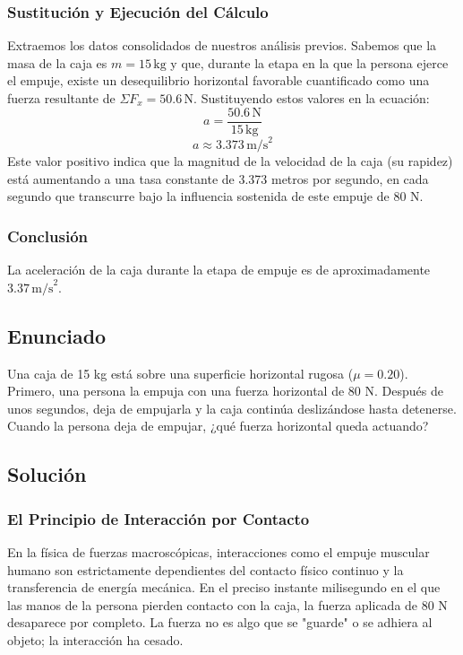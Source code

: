 \documentclass[12pt]{article}
\begin{document}
\subsubsection*{Sustitución y Ejecución del Cálculo}
Extraemos los datos consolidados de nuestros análisis previos. Sabemos que la masa de la caja es $m = 15 \, \text{kg}$ y que, durante la etapa en la que la persona ejerce el empuje, existe un desequilibrio horizontal favorable cuantificado como una fuerza resultante de $\Sigma F_x = 50.6 \, \text{N}$. Sustituyendo estos valores en la ecuación:
\begin{equation}
    a = \frac{50.6 \, \text{N}}{15 \, \text{kg}}
\end{equation}
\begin{equation}
    a \approx 3.373 \, \text{m/s}^2
\end{equation}
Este valor positivo indica que la magnitud de la velocidad de la caja (su rapidez) está aumentando a una tasa constante de 3.373 metros por segundo, en cada segundo que transcurre bajo la influencia sostenida de este empuje de 80 N.

\subsubsection*{Conclusión}
La aceleración de la caja durante la etapa de empuje es de aproximadamente $3.37 \, \text{m/s}^2$.

\newpage

\subsection*{Enunciado}
Una caja de 15 kg está sobre una superficie horizontal rugosa ($\mu = 0.20$). Primero, una persona la empuja con una fuerza horizontal de 80 N. Después de unos segundos, deja de empujarla y la caja continúa deslizándose hasta detenerse. Cuando la persona deja de empujar, ¿qué fuerza horizontal queda actuando?

\subsection*{Solución}

\subsubsection*{El Principio de Interacción por Contacto}
En la física de fuerzas macroscópicas, interacciones como el empuje muscular humano son estrictamente dependientes del contacto físico continuo y la transferencia de energía mecánica. En el preciso instante milisegundo en el que las manos de la persona pierden contacto con la caja, la fuerza aplicada de 80 N desaparece por completo. La fuerza no es algo que se "guarde" o se adhiera al objeto; la interacción ha cesado.
\end{document}
